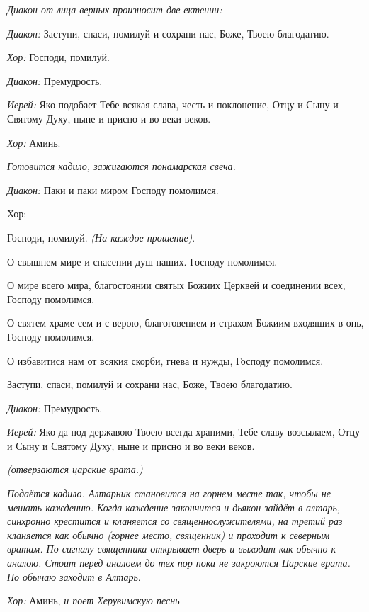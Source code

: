 \begin{mymulticols}




{\itshape Диакон от лица верных произносит две ектении:}


  {\itshape Диакон:} Заступи, спаси, помилуй и сохрани нас, Боже, Твоею благодатию.


{\itshape Хор:} Господи, помилуй.


{\itshape Диакон:} Премудрость.


 {\itshape Иерей:} Яко подобает Тебе всякая слава, честь и поклонение, Отцу и Сыну и Святому Духу, ныне и присно и во веки веков.


 {\itshape Хор:} Аминь.


 {\itshape Готовится кадило, зажигаются понамарская свеча.}


  {\itshape Диакон:} Паки и паки миром Господу помолимся.  {\itshape 


  Хор:} Господи, помилуй. {\itshape (На каждое прошение)}. 


  О свышнем мире и спасении душ наших. Господу помолимся. 


  О мире всего мира, благостоянии святых Божиих Церквей и соединении всех, Господу помолимся. 


  О святем храме сем и с верою, благоговением и страхом Божиим входящих в онь, Господу помолимся. 


  О избавитися нам от всякия скорби, гнева и нужды, Господу помолимся. 


  Заступи, спаси, помилуй и сохрани нас, Боже, Твоею благодатию. 

{\itshape Диакон:} Премудрость. 

{\itshape Иерей:} Яко да под державою Твоею всегда храними, Тебе славу возсылаем, Отцу и Сыну и Святому Духу, ныне и присно и во веки веков. 


 {\itshape (отверзаются царские врата.)}


 {\itshape Подаётся кадило. Алтарник становится на горнем месте так, чтобы не мешать каждению. Когда каждение закончится и дьякон зайдёт в алтарь, синхронно крестится и кланяется со священнослужителями, на третий раз кланяется как обычно (горнее место, священник) и проходит к северным вратам. По сигналу священника открывает дверь и выходит как обычно к аналою. Стоит перед аналоем до тех пор пока не закроются Царские врата. По обычаю заходит в Алтарь}. 


 {\itshape Хор:} Аминь, {\itshape и поет Херувимскую песнь }



\end{mymulticols}
